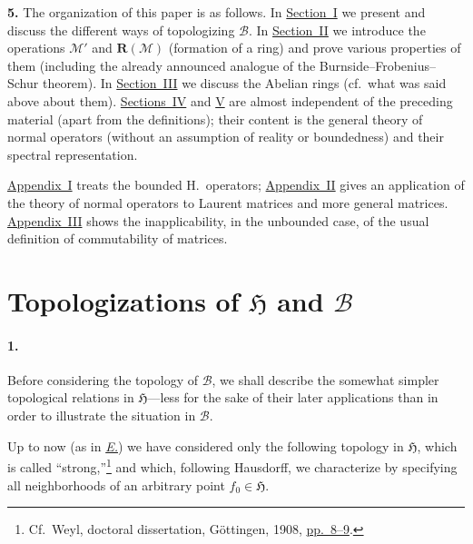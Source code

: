 \documentclass[
  paper=b5,
  twoside=true,
  fontsize=13pt,
  headings=normal,
  bookmarkpackage=false
]{scrartcl}
\theoremstyle{definition}
\newcommand{\Eref}{\hyperref[fn:E-paper]{\emph{E.}}}
\newcommand{\GeneratedRing}{\boldsymbol{R}}
\begin{document}
\medskip
{}
\noindent\textbf{5.}\label{intro:5}
The organization of this paper is as follows. In
\hyperref[sec:topologies]{Section~I} we present and
discuss the different ways of topologizing \(\mathcal B\). In
\hyperref[sec:ring-and-commutant]{Section~II} we
introduce the operations $\mathcal M'$ and $\GeneratedRing (\mathcal M)$ (formation of
a ring) and prove various properties of them (including the already
announced analogue of the Burnside--Frobenius--Schur theorem).
In \hyperref[sec:iii]{Section~III} we discuss the Abelian rings (cf.\ what was said above about
them). \hyperref[sec:iv-normal-operators]{Sections~IV} and
\hyperref[sec:v-spectral-form]{V} are almost independent of the preceding material
(apart from the definitions); their content is the general theory of normal
operators (without an assumption of reality or boundedness) and their
spectral representation.

\hyperref[app:bounded-spectral-families]{Appendix~I} treats the bounded
H.\ operators; \hyperref[app:laurent-matrices]{Appendix~II} gives an
application of the theory of normal operators to Laurent matrices and more
general matrices. \hyperref[app:commutativity-unbounded]{Appendix~III}
shows the inapplicability, in the unbounded
case, of the usual definition of commutability of matrices.

\section{Topologizations of \texorpdfstring{$\mathfrak H$ and
$\mathcal B$}{H and B}}\label{sec:topologies}

\paragraph*{1.}\label{sec:topologies-1}
Before considering the topology of $\mathcal B$, we shall describe the
somewhat simpler topological relations in $\mathfrak H$---less for the sake
of their later applications than in order to illustrate the situation in
$\mathcal B$.

Up to now (as in \Eref) we have considered only the following topology in
$\mathfrak H$, which is called ``strong,''\footnote{\label{fn:27}Cf.\ Weyl, doctoral
dissertation, G\"ottingen, 1908, \href{https://jscholarship.library.jhu.edu/bitstream/handle/1774.2/34190/31151014634046.pdf}{pp.~8--9}.} and which, following Hausdorff,
we characterize by specifying all neighborhoods of an arbitrary point
$f_0\in\mathfrak H$.
\end{document}
